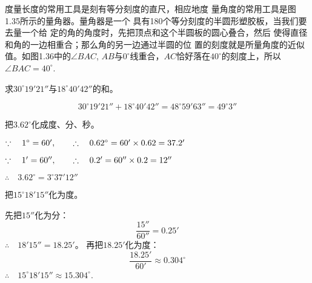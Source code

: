 度量长度的常用工具是刻有等分刻度的直尺，相应地度
量角度的常用工具是图1.35所示的量角器。量角器是一个
具有180个等分刻度的半圆形塑胶板，当我们要去量一个给
定的角的角度时，先把顶点和这个半圆板的圆心叠合，然后
使得直径和角的一边相重合；那么角的另一边通过半圆的位
置的刻度就是所量角度的近似值。如图1.36中的$\angle BAC$,
$AB$与$0^{\circ}$线重合，$AC$恰好落在$40^{\circ}$的刻度上，所以$\angle BAC=40^{\circ}$.

\begin{figure}[htp]
	\centering
{}	
	\caption{}
\end{figure}

\begin{example}
	求$30^{\circ}19'21''$与$18^{\circ}40'42''$的和。
\end{example}

\begin{solution}
\[30^{\circ}19'21''+18^{\circ}40'42''=48^{\circ}59'63''=49^{\circ}3''\]
\end{solution}

\begin{example}
	把$3.62^{\circ}$化成度、分、秒。
\end{example}

\begin{solution}
$\because\quad 1^{\circ}=60',\qquad \therefore\quad 0.62^{\circ}=60'\times 0.62=37.2'$

$\because\quad 1'=60'',\qquad \therefore\quad 0.2'=60''\times 0.2=12''$

$\therefore\quad 3.62^{\circ}=3^{\circ}37'12''$
\end{solution}

\begin{example}
	把$15^{\circ}18'15''$化为度。
\end{example}


\begin{solution}
	先把$15''$化为分：
\[\frac{15''}{60''}=0.25'\]
$\therefore\quad 18'15''=18.25'$。
再把$18.25'$化为度：
\[\frac{18.25'}{60'}\approx 0.304^{\circ}\]
$\therefore\quad 15^{\circ}18'15''\approx 15.304^{\circ}$.
\end{solution}

